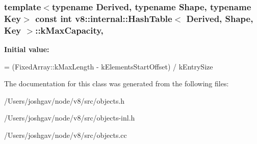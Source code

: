 \subsubsection[{\texorpdfstring{k\+Max\+Capacity}{kMaxCapacity}}]{\setlength{\rightskip}{0pt plus 5cm}template$<$typename Derived, typename Shape, typename Key$>$ const int {\bf v8\+::internal\+::\+Hash\+Table}$<$ Derived, Shape, Key $>$\+::k\+Max\+Capacity\hspace{0.3cm}{\ttfamily [static]}, {\ttfamily [protected]}}\hypertarget{classv8_1_1internal_1_1_hash_table_ac08bac76e122c2738f8c15c21f8365dd}{}\label{classv8_1_1internal_1_1_hash_table_ac08bac76e122c2738f8c15c21f8365dd}
{\bfseries Initial value\+:}
\begin{DoxyCode}
=
      (FixedArray::kMaxLength - kElementsStartOffset) / kEntrySize
\end{DoxyCode}


The documentation for this class was generated from the following files\+:\begin{DoxyCompactItemize}
\item 
/\+Users/joshgav/node/v8/src/objects.\+h\item 
/\+Users/joshgav/node/v8/src/objects-\/inl.\+h\item 
/\+Users/joshgav/node/v8/src/objects.\+cc\end{DoxyCompactItemize}
